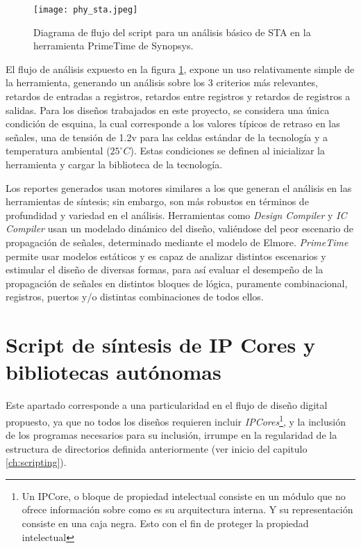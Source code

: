 \begin{figure}[ht]
\texttt{[image: phy\_sta.jpeg]}
\centering
\caption{Diagrama de flujo del script para un análisis básico de STA en la herramienta PrimeTime de Synopsys.}
\label{fig:stascript}
\end{figure}

El flujo de análisis expuesto en la figura \ref{fig:stascript}, expone un uso relativamente simple de la herramienta, generando un análisis sobre los 3 criterios más relevantes, retardos de entradas a registros, retardos entre registros y retardos de registros a salidas. Para los diseños trabajados en este proyecto, se considera una única condición de esquina, la cual corresponde a los valores típicos de retraso en las señales, una de tensión de 1.2v para las celdas estándar de la tecnología y a temperatura ambiental ($25^{\circ}C$). Estas condiciones se definen al inicializar la herramienta y cargar la biblioteca de la tecnología.

Los reportes generados usan motores similares a los que generan el análisis en las herramientas de síntesis; sin embargo, son más robustos en términos de profundidad y variedad en el análisis. Herramientas como \textit{Design Compiler} y \textit{IC Compiler} usan un modelado dinámico del diseño, valiéndose del peor escenario de propagación de señales, determinado mediante el modelo de Elmore. \textit{PrimeTime} permite usar modelos estáticos y es capaz de analizar distintos escenarios y estimular el diseño de diversas formas, para así evaluar el desempeño de la propagación de señales en distintos bloques de lógica, puramente combinacional, registros, puertos y/o distintas combinaciones de todos ellos.

\section{Script de síntesis de IP Cores y bibliotecas autónomas}
\label{sec:ip_syn}
Este apartado corresponde a una particularidad en el flujo de diseño digital propuesto, ya que no todos los diseños requieren incluir \textit{IPCores}\footnote{Un IPCore, o bloque de propiedad intelectual consiste en un módulo que no ofrece información sobre como es su arquitectura interna. Y su representación consiste en una caja negra. Esto con el fin de proteger la propiedad intelectual}, y la inclusión de los programas necesarios para su inclusión, irrumpe en la regularidad de la estructura de directorios definida anteriormente (ver inicio del capitulo \ref{ch:scripting}).

